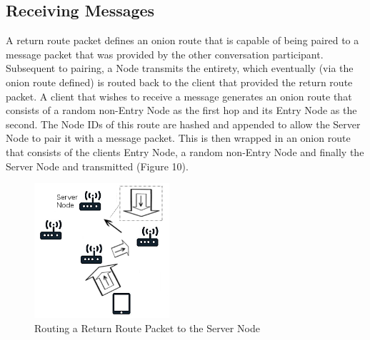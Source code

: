 \documentclass{article}
\begin{document}
\subsection{Receiving Messages}
A return route packet defines an onion route that is capable of being paired to a message packet that was provided by the other conversation participant. Subsequent to pairing, a Node transmits the entirety, which eventually (via the onion route defined) is routed back to the client that provided the return route packet. A client that wishes to receive a message generates an onion route that consists of a random non-Entry Node as the first hop and its Entry Node as the second. The Node IDs of this route are hashed and appended to allow the Server Node to pair it with a message packet. This is then wrapped in an onion route that consists of the clients Entry Node,
a random non-Entry Node and finally the Server Node and transmitted (Figure 10).
\begin{figure}[h]
	\centering
  	\includegraphics[width=5cm,height=5cm,keepaspectratio]{img/ReturnRoutePacket.png}
	\caption{Routing a Return Route Packet to the Server Node}
\end{figure}
\end{document}
